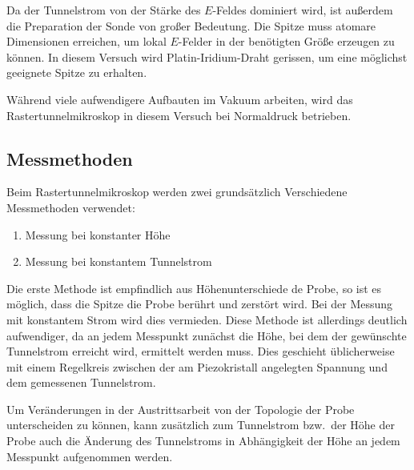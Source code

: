 Da der Tunnelstrom von der Stärke des $E$-Feldes dominiert wird,
ist außerdem die Preparation der Sonde von großer Bedeutung.
Die Spitze muss atomare Dimensionen erreichen, um lokal $E$-Felder in der benötigten Größe erzeugen zu können.
In diesem Versuch wird Platin-Iridium-Draht gerissen, um eine möglichst geeignete Spitze zu erhalten.

Während viele aufwendigere Aufbauten im Vakuum arbeiten, wird das Rastertunnelmikroskop in diesem Versuch bei Normaldruck betrieben.

\subsection{Messmethoden}

Beim Rastertunnelmikroskop werden zwei grundsätzlich Verschiedene Messmethoden verwendet:
\begin{enumerate}[noitemsep]
  \item Messung bei konstanter Höhe
  \item Messung bei konstantem Tunnelstrom
\end{enumerate}

Die erste Methode ist empfindlich aus Höhenunterschiede de Probe, so ist es möglich, dass die Spitze die Probe berührt und zerstört wird.
Bei der Messung mit konstantem Strom wird dies vermieden. 
Diese Methode ist allerdings deutlich aufwendiger, da an jedem Messpunkt zunächst die Höhe, bei dem der gewünschte Tunnelstrom erreicht wird, ermittelt werden muss.
Dies geschieht üblicherweise mit einem Regelkreis zwischen der am Piezokristall angelegten Spannung und dem gemessenen Tunnelstrom.

Um Veränderungen in der Austrittsarbeit von der Topologie der Probe unterscheiden zu können, kann zusätzlich zum Tunnelstrom bzw.\ der Höhe der Probe auch die Änderung des Tunnelstroms in Abhängigkeit der Höhe an jedem Messpunkt aufgenommen werden.
